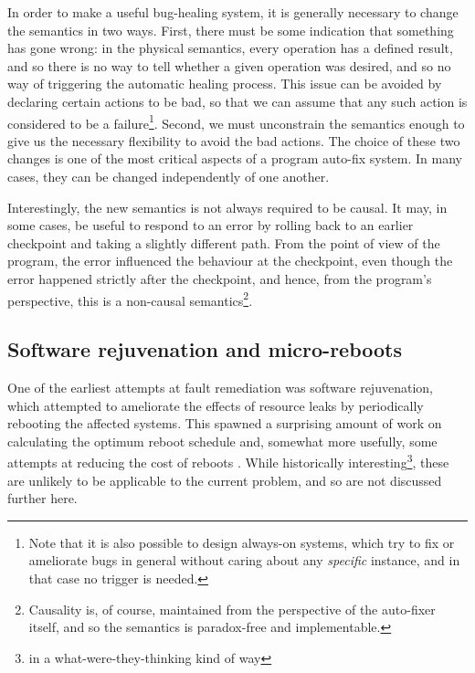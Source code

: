 In order to make a useful bug-healing system, it is generally
necessary to change the semantics in two ways.  First, there must be
some indication that something has gone wrong: in the physical
semantics, every operation has a defined result, and so there is no
way to tell whether a given operation was desired, and so no way of
triggering the automatic healing process.  This issue can be avoided
by declaring certain actions to be bad, so that we can assume that any
such action is considered to be a failure\footnote{Note that it is
  also possible to design always-on systems, which try to fix or
  ameliorate bugs in general without caring about any \emph{specific}
  instance, and in that case no trigger is needed.}.  Second, we must
unconstrain the semantics enough to give us the necessary flexibility
to avoid the bad actions.  The choice of these two changes is one of
the most critical aspects of a program auto-fix system.  In many
cases, they can be changed independently of one another.

Interestingly, the new semantics is not always required to be causal.
It may, in some cases, be useful to respond to an error by rolling
back to an earlier checkpoint and taking a slightly different path.
From the point of view of the program, the error influenced the
behaviour at the checkpoint, even though the error happened strictly
after the checkpoint, and hence, from the program's perspective, this
is a non-causal semantics\footnote{Causality is, of course, maintained
  from the perspective of the auto-fixer itself, and so the semantics
  is paradox-free and implementable.}.

\subsection{Software rejuvenation and micro-reboots}

One of the earliest attempts at fault remediation was software
rejuvenation\cite{Huang1995}, which attempted to ameliorate the
effects of resource leaks by periodically rebooting the affected
systems.  This spawned a surprising amount of work on calculating the
optimum reboot schedule
\cite{Li2002,Vaidyanathan1999,Vaidyanathan2001,Trivedi2000,Garg1998,Garg1995,Garg1998a,Castelli2001} and, somewhat more
usefully, some attempts at reducing the cost of reboots
\cite{Candea2002,Candea2001,Candea,Patterson2002}.  While historically
interesting\footnote{in a what-were-they-thinking kind of way}, these
are unlikely to be applicable to the current problem, and so are not
discussed further here.

